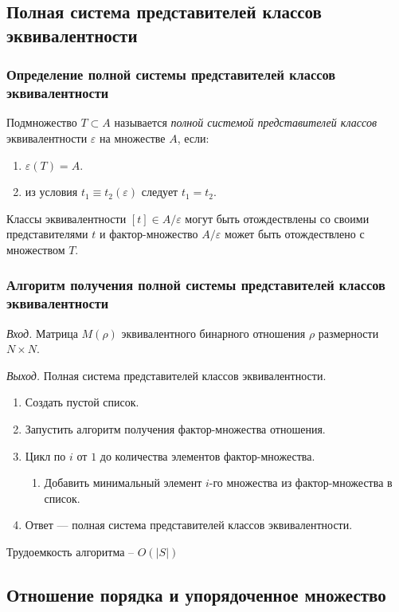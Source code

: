 \documentclass[bachelor, och, labwork]{shiza}
\begin{document}
\subsection{Полная система представителей классов эквивалентности}
\subsubsection{Определение полной системы представителей классов эквивалентности}
Подмножество $T\subset A$ называется \textit{полной системой представителей классов}
эквивалентности $\varepsilon$ на множестве $A$, если:
\begin{center}
    \begin{enumerate}
        \item $\varepsilon(T)=A$.
        \item из условия $t_1\equiv t_2(\varepsilon)$ следует $t_1=t_2$.
    \end{enumerate}
\end{center}
Классы эквивалентности $[t]\in A/\varepsilon$ могут быть отождествлены со своими
представителями $t$ и фактор-множество $A/\varepsilon$ может быть
отождествлено с множеством $T$.

\subsubsection{Алгоритм получения полной системы представителей классов эквивалентности}
\textit{Вход.} Матрица $M(\rho)$ эквивалентного бинарного отношения $\rho$ размерности
$N \times N$.

\textit{Выход.} Полная система представителей классов эквивалентности.
\begin{enumerate}
    \item Создать пустой список.
    \item Запустить алгоритм получения фактор-множества отношения.
    \item Цикл по $i$ от $1$ до количества элементов фактор-множества.
        \begin{enumerate} \item Добавить минимальный элемент $i$-го множества из фактор-множества в список.\end{enumerate}
    \item Ответ --- полная система представителей классов эквивалентности.
\end{enumerate}
Трудоемкость алгоритма -- $O(|S|)$

\subsection{Отношение порядка и упорядоченное множество}
\end{document}

